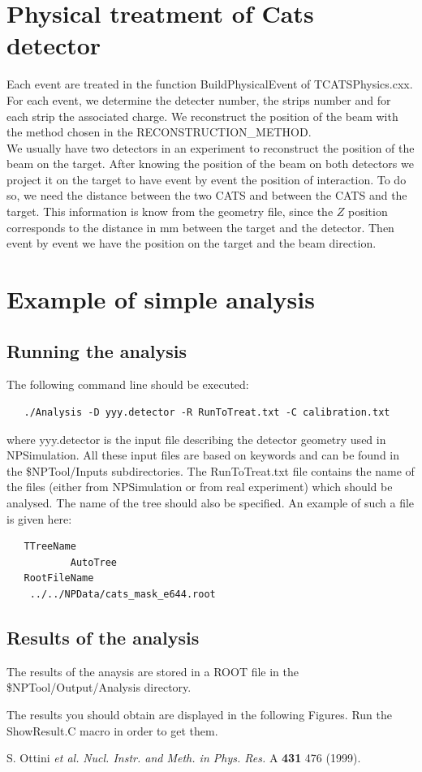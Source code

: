 \documentclass[a4paper,12pt]{article}
\begin{document}
\section{Physical treatment of Cats detector}
Each event are treated in the function BuildPhysicalEvent of TCATSPhysics.cxx. For each event, we determine the detecter number, the strips number and for each strip the associated charge. We reconstruct the position of the beam with the method chosen in the RECONSTRUCTION\_METHOD.\\
We usually have two detectors in an experiment to reconstruct the position of the beam on the target. After knowing the position of the beam on both detectors we project it on the target to have event by event the position of interaction. To do so, we need the distance between the two CATS and between the CATS and the target. This information is know from the geometry file, since the $Z$ position corresponds to the distance in mm between the target and the detector. Then event by event we have the position on the target and the beam direction.

\section{Example of simple analysis}
\subsection{Running the analysis}
The following command line should be executed:

\begin{verbatim}
   ./Analysis -D yyy.detector -R RunToTreat.txt -C calibration.txt
\end{verbatim}

where yyy.detector is the input file describing the detector geometry used in NPSimulation. All these input files are based on keywords and can be found  in the \$NPTool/Inputs subdirectories. The RunToTreat.txt file contains the name of the files (either from NPSimulation or from real experiment) which should be analysed. The name of the tree should also be specified. An example of such a file is given here:

\begin{verbatim}
   TTreeName
           AutoTree
   RootFileName
	../../NPData/cats_mask_e644.root
\end{verbatim}


\subsection{Results of the analysis}
The results of the anaysis are stored in a ROOT file in the \$NPTool/Output/Analysis
directory. 

The results you should obtain are displayed in the following Figures. Run the 
ShowResult.C macro in order to get them.

\begin{thebibliography}{99}
 S. Ottini {\it et al.} {\it Nucl. Instr. and Meth. in Phys. Res.} A {\bf 431} 476 (1999).
\end{thebibliography}
\end{document}
